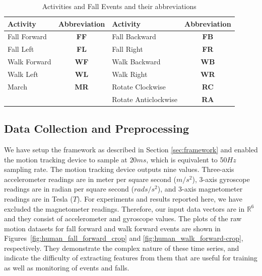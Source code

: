 \documentclass[]{IEEEtran}
\begin{document}
\begin{table}[htb]
\caption{Activities and Fall Events and their abbreviations}
\centering
{
\begin{tabular}{|l|c||l|c|}
\hline
Activity & Abbreviation&Activity &Abbreviation\\  \hline \hline
Fall Forward &\textbf{FF}&Fall Backward &\textbf{FB}  \\ \hline
Fall Left &\textbf{FL}&Fall Right &\textbf{FR}   \\ \hline
Walk Forward &\textbf{WF}&Walk Backward &\textbf{WB} \\ \hline
Walk Left &\textbf{WL}& Walk Right &\textbf{WR} \\ \hline
March &\textbf{MR}&Rotate Clockwise &\textbf{RC} \\ \hline
&&Rotate Anticlockwise&\textbf{RA}\\ \hline
\end{tabular}
}
\label{Tbl:ListOfActivities}
\end{table}


\subsection{Data Collection and Preprocessing  }
\label{subsec:preDataCollection}

We have setup the framework as described in Section \ref{sec:framework} and
enabled the motion tracking device to sample at $20ms$, which is equivalent to
50$Hz$ sampling rate. The motion tracking device outputs nine values.
Three-axis  accelerometer readings are in  meter per square second ($m/s^2$),
3-axis gyroscope readings are in radian per square second ($rads/s^2$), and
3-axis magnetometer readings are  in Tesla ($T$). For experiments  and results
reported here, we have excluded the magnetometer readings. Therefore, our input
data vectors  are in $\mathbb{R}^6$ and they consist of accelerometer and
gyroscope values. The plots of the raw motion datasets for fall forward and
walk forward events are shown in Figures~\ref{fig:human_fall_forward_crop} and
\ref{fig:human_walk_forward-crop}, respectively. They demonstrate the complex
nature of these time series, and indicate the difficulty of extracting features
from them that are useful for training as well as monitoring of events and
falls.
\end{document}

